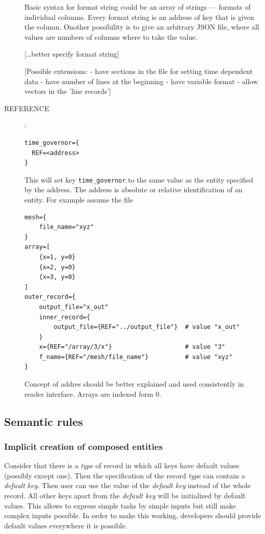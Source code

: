 \documentclass[12pt,a4paper]{report}
\begin{document}
\begin{description}
Basic syntax for format string could be an array of strings --- formats of individual columns.
Every format string is an address of key that is given the column. Onother possibility is to give an arbitrary 
JSON file, where all values are numbers of columns where to take the value.

[\dots better specify format string]


[Possible extensions:
- have sections in the file for setting time dependent data
- have number of lines at the beginning
- have variable format
- allow vectors in the 'line records']

\item[REFERENCE]:\\
\begin{verbatim}
time_governor={
  REF=<address>
}
\end{verbatim}
This will set key \verb'time_governor' to the same value as the entity specified by the address.
The address is absolute or relative identification of an entity. For example assume the file
\begin{verbatim}
mesh={
	file_name="xyz"
}
array=[
	{x=1, y=0}	 
	{x=2, y=0}
	{x=3, y=0}
]		
outer_record={
	output_file="x_out"
	inner_record={
		output_file={REF="../output_file"} 	# value "x_out"
	}
	x={REF="/array/3/x"}					# value "3"
	f_name={REF="/mesh/file_name"}			# value "xyz"
}	
\end{verbatim}

Concept of addres should be better explained and used consistently in reader interface. Arrays are indexed form $0$.
\end{description}

\subsection{Semantic rules}

\subsubsection{Implicit creation of composed entities}
Consider that there is a {\it type} of record in which all keys have default values (possibly except one). Then the specification
of the record {\it type} can contain a {\it default key}. Then user can use the value of the {\it default key} instead of the whole record.
All other keys apart from the {\it default key} will be initialized by default values. 
This allows to express simple tasks by simple inputs but still make complex inputs possible. 
In order to make this working, developers should provide default values everywhere it is possible.
 
\end{document}
